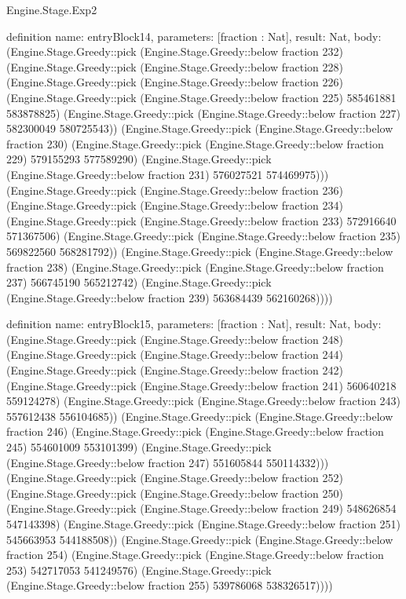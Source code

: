 \begin{lexlean}{Engine.Stage.Exp2}
\begin{semanticmodule}
definition{
  name: entryBlock14,
  parameters: [fraction : Nat],
  result: Nat,
  body: (Engine.Stage.Greedy::pick (Engine.Stage.Greedy::below fraction 232) (Engine.Stage.Greedy::pick (Engine.Stage.Greedy::below fraction 228) (Engine.Stage.Greedy::pick (Engine.Stage.Greedy::below fraction 226) (Engine.Stage.Greedy::pick (Engine.Stage.Greedy::below fraction 225) 585461881 583878825) (Engine.Stage.Greedy::pick (Engine.Stage.Greedy::below fraction 227) 582300049 580725543)) (Engine.Stage.Greedy::pick (Engine.Stage.Greedy::below fraction 230) (Engine.Stage.Greedy::pick (Engine.Stage.Greedy::below fraction 229) 579155293 577589290) (Engine.Stage.Greedy::pick (Engine.Stage.Greedy::below fraction 231) 576027521 574469975))) (Engine.Stage.Greedy::pick (Engine.Stage.Greedy::below fraction 236) (Engine.Stage.Greedy::pick (Engine.Stage.Greedy::below fraction 234) (Engine.Stage.Greedy::pick (Engine.Stage.Greedy::below fraction 233) 572916640 571367506) (Engine.Stage.Greedy::pick (Engine.Stage.Greedy::below fraction 235) 569822560 568281792)) (Engine.Stage.Greedy::pick (Engine.Stage.Greedy::below fraction 238) (Engine.Stage.Greedy::pick (Engine.Stage.Greedy::below fraction 237) 566745190 565212742) (Engine.Stage.Greedy::pick (Engine.Stage.Greedy::below fraction 239) 563684439 562160268))))
}

definition{
  name: entryBlock15,
  parameters: [fraction : Nat],
  result: Nat,
  body: (Engine.Stage.Greedy::pick (Engine.Stage.Greedy::below fraction 248) (Engine.Stage.Greedy::pick (Engine.Stage.Greedy::below fraction 244) (Engine.Stage.Greedy::pick (Engine.Stage.Greedy::below fraction 242) (Engine.Stage.Greedy::pick (Engine.Stage.Greedy::below fraction 241) 560640218 559124278) (Engine.Stage.Greedy::pick (Engine.Stage.Greedy::below fraction 243) 557612438 556104685)) (Engine.Stage.Greedy::pick (Engine.Stage.Greedy::below fraction 246) (Engine.Stage.Greedy::pick (Engine.Stage.Greedy::below fraction 245) 554601009 553101399) (Engine.Stage.Greedy::pick (Engine.Stage.Greedy::below fraction 247) 551605844 550114332))) (Engine.Stage.Greedy::pick (Engine.Stage.Greedy::below fraction 252) (Engine.Stage.Greedy::pick (Engine.Stage.Greedy::below fraction 250) (Engine.Stage.Greedy::pick (Engine.Stage.Greedy::below fraction 249) 548626854 547143398) (Engine.Stage.Greedy::pick (Engine.Stage.Greedy::below fraction 251) 545663953 544188508)) (Engine.Stage.Greedy::pick (Engine.Stage.Greedy::below fraction 254) (Engine.Stage.Greedy::pick (Engine.Stage.Greedy::below fraction 253) 542717053 541249576) (Engine.Stage.Greedy::pick (Engine.Stage.Greedy::below fraction 255) 539786068 538326517))))
}


\end{semanticmodule}
\end{lexlean}
